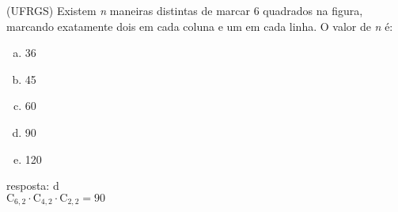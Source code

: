 \begin{ex}
    (UFRGS) Existem \textit{n} maneiras distintas de marcar 6 quadrados na figura, marcando exatamente dois em cada coluna e um em cada linha. O valor de \textit{n} é:
\begin{center}
\end{center}
   \begin{enumerate}[(a)]
   \item 36
   \item 45
   \item 60
   \item 90
   \item 120
   \end{enumerate}
     \begin{sol}
       resposta: d \\
       $\mathrm{C}_{6,2}\cdot\mathrm{C}_{4,2}\cdot\mathrm{C}_{2,2}=90$
     \end{sol}
\end{ex}